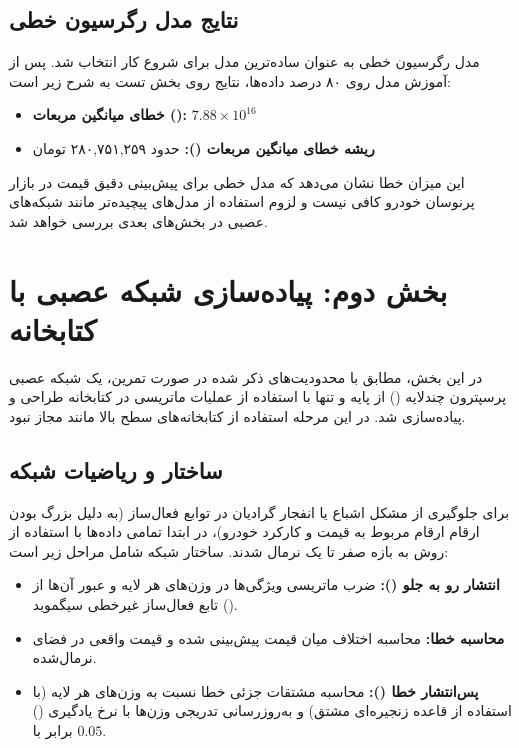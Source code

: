 \documentclass[12pt, a4paper]{article}
\begin{document}
\subsection{نتایج مدل رگرسیون خطی}
مدل رگرسیون خطی به عنوان ساده‌ترین مدل برای شروع کار انتخاب شد. پس از آموزش مدل روی ۸۰ درصد داده‌ها، نتایج روی بخش تست به شرح زیر است:

\begin{itemize}
	\item \textbf{خطای میانگین مربعات ():} $7.88 \times 10^{16}$
	\item \textbf{ریشه خطای میانگین مربعات ():} حدود ۲۸۰,۷۵۱,۲۵۹ تومان
\end{itemize}

این میزان خطا نشان می‌دهد که مدل خطی برای پیش‌بینی دقیق قیمت در بازار پرنوسان خودرو کافی نیست و لزوم استفاده از مدل‌های پیچیده‌تر مانند شبکه‌های عصبی در بخش‌های بعدی بررسی خواهد شد.
	
\section{بخش دوم: پیاده‌سازی شبکه عصبی با کتابخانه }
در این بخش، مطابق با محدودیت‌های ذکر شده در صورت تمرین، یک شبکه عصبی پرسپترون چندلایه () از پایه و تنها با استفاده از عملیات ماتریسی در کتابخانه  طراحی و پیاده‌سازی شد. در این مرحله استفاده از کتابخانه‌های سطح بالا مانند  مجاز نبود.

\subsection{ساختار و ریاضیات شبکه}
برای جلوگیری از مشکل اشباع یا انفجار گرادیان در توابع فعال‌ساز (به دلیل بزرگ بودن ارقام ارقام مربوط به قیمت و کارکرد خودرو)، در ابتدا تمامی داده‌ها با استفاده از روش  به بازه صفر تا یک نرمال شدند. ساختار شبکه شامل مراحل زیر است:
\begin{itemize}
	\item \textbf{انتشار رو به جلو ():} ضرب ماتریسی ویژگی‌ها در وزن‌های هر لایه و عبور آن‌ها از تابع فعال‌ساز غیرخطی سیگموید ().
	\item \textbf{محاسبه خطا:} محاسبه اختلاف میان قیمت پیش‌بینی شده و قیمت واقعی در فضای نرمال‌شده.
	\item \textbf{پس‌انتشار خطا ():} محاسبه مشتقات جزئی خطا نسبت به وزن‌های هر لایه (با استفاده از قاعده زنجیره‌ای مشتق) و به‌روزرسانی تدریجی وزن‌ها با نرخ یادگیری () برابر با $0.05$.
\end{itemize}
\end{document}

